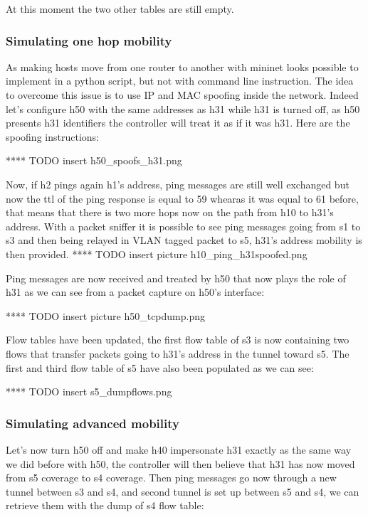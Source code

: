 \documentclass{article}
\begin{document}
At this moment the two other tables are still empty.

\subsubsection{Simulating one hop mobility}

As making hosts move from one router to another with mininet looks
possible to implement in a python script, but not with command line
instruction. The idea to overcome this issue is to use IP and MAC
spoofing inside the network. Indeed let's configure h50 with the same
addresses as h31 while h31 is turned off, as h50 presents h31
identifiers the controller will treat it as if it was h31.
Here are the spoofing instructions: 

**** TODO insert h50_spoofs_h31.png

Now, if h2 pings again h1's address, ping messages are still well
exchanged but now the ttl of the ping response is equal to 59 whearas
it was equal to 61 before, that means that there is two more hops now
on the path from h10 to h31's address. With a packet sniffer it is
possible to see ping messages going from s1 to s3 and then being
relayed in VLAN tagged packet to s5, h31's address mobility is then
provided.
**** TODO insert picture h10_ping_h31spoofed.png

Ping messages are now received and treated by h50 that now plays the
role of h31 as we can see from a packet capture on h50's interface:

**** TODO insert picture h50_tcpdump.png

Flow tables have been updated, the first flow table of s3 is now
containing two flows that transfer packets going to h31's address in
the tunnel toward s5. The first and third flow table of s5 have
also been populated as we can see:

**** TODO insert s5_dumpflows.png

\subsubsection{Simulating advanced mobility}

Let's now turn h50 off and make h40 impersonate h31 exactly as the same
way we did before with h50, the controller will then believe that h31
has now moved from s5 coverage to s4 coverage.  Then ping messages go
now through a new tunnel between s3 and s4, and second tunnel is set
up between s5 and s4, we can retrieve them with the dump of s4 flow
table:
\end{document}
